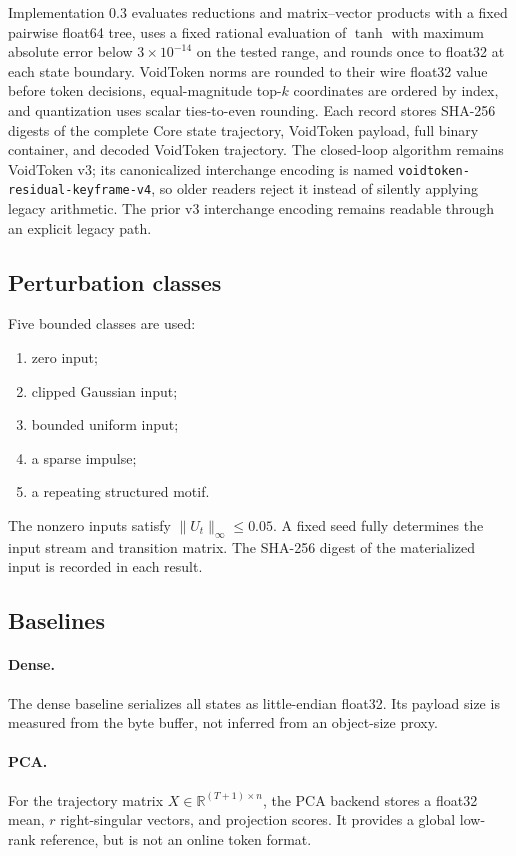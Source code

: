 \documentclass[10pt]{article}
\newcommand{\R}{\mathbb{R}}
\begin{document}
Implementation 0.3 evaluates reductions and matrix--vector products with a
fixed pairwise float64 tree, uses a fixed rational evaluation of $\tanh$ with
maximum absolute error below $3\times10^{-14}$ on the tested range, and rounds
once to float32 at each state boundary. VoidToken norms are rounded to their
wire float32 value before token decisions, equal-magnitude top-$k$ coordinates
are ordered by index, and quantization uses scalar ties-to-even rounding. Each
record stores SHA-256 digests of the complete Core state trajectory, VoidToken
payload, full binary container, and decoded VoidToken trajectory. The
closed-loop algorithm remains VoidToken v3; its canonicalized interchange
encoding is named \texttt{voidtoken-residual-keyframe-v4}, so older readers
reject it instead of silently applying legacy arithmetic. The prior v3
interchange encoding remains readable through an explicit legacy path.

\subsection{Perturbation classes}

Five bounded classes are used:
\begin{enumerate}[leftmargin=1.4em,itemsep=1pt]
  \item zero input;
  \item clipped Gaussian input;
  \item bounded uniform input;
  \item a sparse impulse;
  \item a repeating structured motif.
\end{enumerate}
The nonzero inputs satisfy $\lVert U_t\rVert_\infty\leq 0.05$. A fixed seed
fully determines the input stream and transition matrix. The SHA-256 digest of
the materialized input is recorded in each result.

\subsection{Baselines}

\paragraph{Dense.}
The dense baseline serializes all states as little-endian float32. Its payload
size is measured from the byte buffer, not inferred from an object-size proxy.

\paragraph{PCA.}
For the trajectory matrix $X\in\R^{(T+1)\times n}$, the PCA backend stores a
float32 mean, $r$ right-singular vectors, and projection scores. It provides a
global low-rank reference, but is not an online token format.
\end{document}
